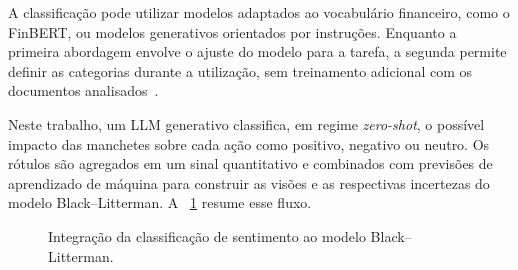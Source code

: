 A classificação pode utilizar modelos adaptados ao vocabulário
financeiro, como o FinBERT, ou modelos generativos orientados por
instruções. Enquanto a primeira abordagem envolve o ajuste do
modelo para a tarefa, a segunda permite definir as categorias
durante a utilização, sem treinamento adicional com os documentos
analisados~\cite{araci2019finbert,lopezlira2023chatgpt}.

Neste trabalho, um LLM generativo classifica, em regime
\textit{zero-shot}, o possível impacto das manchetes sobre cada
ação como positivo, negativo ou neutro. Os rótulos são agregados
em um sinal quantitativo e combinados com previsões de aprendizado
de máquina para construir as visões e as respectivas incertezas
do modelo Black--Litterman.
A ~\ref{fig:pipeline_sentimento} resume esse fluxo.

\begin{figure}[htbp]
    \centering
    \caption{Integração da classificação de sentimento ao modelo Black--Litterman.}
    \label{fig:pipeline_sentimento}
\end{figure}
